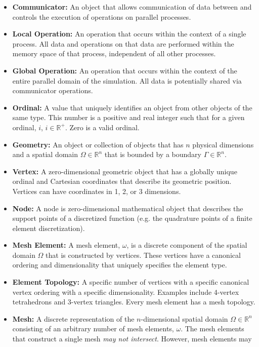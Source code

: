 \documentclass[letterpaper,12pt]{article}
\begin{document}
\begin{itemize}
\item {\bf Communicator:} An object that allows communication of data
  between and controls the execution of operations on parallel
  processes.
\item {\bf Local Operation:} An operation that occurs within the
  context of a single process. All data and operations on that data
  are performed within the memory space of that process, independent
  of all other processes.
\item {\bf Global Operation:} An operation that occurs within the
  context of the entire parallel domain of the simulation. All data is
  potentially shared via communicator operations.
\item {\bf Ordinal:} A value that uniquely identifies an object from
  other objects of the same type. This number is a positive and real
  integer such that for a given ordinal, $i$, $i \in
  \mathbb{R}^+$. Zero is a valid ordinal.
\item {\bf Geometry:} An object or collection of objects that has $n$
  physical dimensions and a spatial domain $\Omega \in \mathbb{R}^n$
  that is bounded by a boundary $\Gamma \in \mathbb{R}^n$.
\item {\bf Vertex:} A zero-dimensional geometric object that has a
  globally unique ordinal and Cartesian coordinates that describe its
  geometric position. Vertices can have coordinates in 1, 2, or 3
  dimensions.
\item {\bf Node:} A node is zero-dimensional mathematical object that
  describes the support points of a discretized function (e.g. the
  quadrature points of a finite element discretization).
\item {\bf Mesh Element:} A mesh element, $\omega$, is a discrete
  component of the spatial domain $\Omega$ that is constructed by
  vertices. These vertices have a canonical ordering and
  dimensionality that uniquely specifies the element type.
\item {\bf Element Topology:} A specific number of vertices with a
  specific canonical vertex ordering with a specific
  dimensionality. Examples include 4-vertex tetrahedrons and 3-vertex
  triangles. Every mesh element has a mesh topology.
\item {\bf Mesh:} A discrete representation of the $n$-dimensional
  spatial domain $\Omega \in \mathbb{R}^n$ consisting of an arbitrary
  number of mesh elements, $\omega$. The mesh elements that construct
  a single mesh {\sl may not intersect}. However, mesh elements may

\end{itemize}
\end{document}
